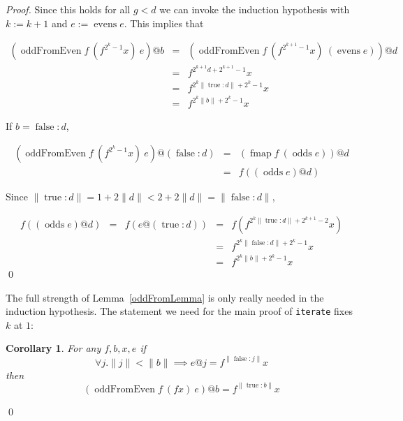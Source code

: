 \documentclass{llncs}
\DeclareMathOperator{\oddFrom}{oddFromEven}
\DeclareMathOperator{\true}{true}
\DeclareMathOperator{\false}{false}
\DeclareMathOperator{\evens}{evens}
\DeclareMathOperator{\odds}{odds}
\DeclareMathOperator{\fmap}{fmap}
\newcommand{\ord}[1]{\|#1\|}
\newcommand{\cons}[2]{#1:#2}
\newtheorem{corollary}[theorem]{Corollary}
\begin{document}
\begin{proof}
Since this holds for all $g < d$ we can invoke the induction hypothesis with $k := k+1$ and $e := \evens e$.
This implies that

\begin{displaymath}
\begin{array}{rcl}
(\oddFrom f\ (f^{2^k-1}x)\ e)@b & = & (\oddFrom f\ (f^{2^{k+1}-1}x)\ (\evens e))@d \\
& = & f^{2^{k+1}d+2^{k+1}-1} x \\
& = & f^{2^k\ord{\cons{\true}{d}}+2^k-1} x \\
& = & f^{2^k\ord{b}+2^k-1} x
\end{array}
\end{displaymath}

If $b = \cons{\false}{d}$,

\begin{displaymath}
\begin{array}{rcl}
(\oddFrom f\ (f^{2^k-1}x)\ e)@(\cons{\false}{d})& = & (\fmap f\ (\odds e))@d \\
& = & f ((\odds e)@d)
\end{array}
\end{displaymath}

Since
$\ord{\cons{\true}{d}} = 1+2\ord{d} < 2+2\ord{d} = \ord{\cons{\false}{d}}$,

\begin{displaymath}
\begin{array}{rcccl}
f((\odds e)@d) & = & f(e@(\cons{\true}{d})) & = & f(f^{2^k\ord{\cons{\true}{d}}+2^{k+1}-2}x) \\
& & & = & f^{2^k\ord{\cons{\false}{d}}+2^k-1}x \\
& & & = & f^{2^k\ord{b}+2^k-1}x
\end{array}
\end{displaymath}
\qed
\end{proof}

The full strength of Lemma~\ref{oddFromLemma} is only really needed in the induction hypothesis.
The statement we need for the main proof of \verb|iterate| fixes $k$ at $1$:

\begin{corollary}\label{oddFromCorollary}
For any $f, b, x, e$
if
\begin{displaymath}
\forall j . \ord{j} < \ord{b} \implies e@j = f^{\ord{\cons{\false}{j}}}x
\end{displaymath}
then
\begin{displaymath}
(\oddFrom f\ (f x)\ e)@b = f^{\ord{\cons{\true}{b}}}x
\end{displaymath}
\end{corollary}
\qed
\end{document}

